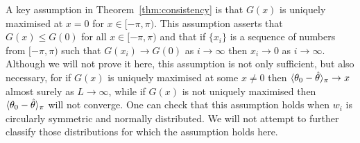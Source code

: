 \documentclass[journal]{IEEEtran}
\begin{document}

A key assumption in Theorem~\ref{thm:consistency} is that $G(x)$ is uniquely maximised at $x = 0$ for $x \in [-\pi, \pi)$.  This assumption asserts that $G(x) \leq G(0)$ for all $x \in [-\pi, \pi)$ and that if $\{x_i\}$ is a sequence of numbers from $[-\pi,\pi)$ such that $G(x_i) \rightarrow G(0)$ as $i \rightarrow \infty$ then $x_i \rightarrow 0$ as $i \rightarrow \infty$.  Although we will not prove it here, this assumption is not only sufficient, but also necessary, for if $G(x)$ is uniquely maximised at some $x \neq 0$ then $\langle \theta_0 - \hat{\theta} \rangle_\pi \rightarrow x$ almost surely as $L\rightarrow\infty$, while if $G(x)$ is not uniquely maximised then $\langle \theta_0 - \hat{\theta} \rangle_\pi$ will not converge.  One can check that this assumption holds when $w_i$ is circularly symmetric and normally distributed.  We will not attempt to further classify those distributions for which the assumption holds here.


\end{document}
